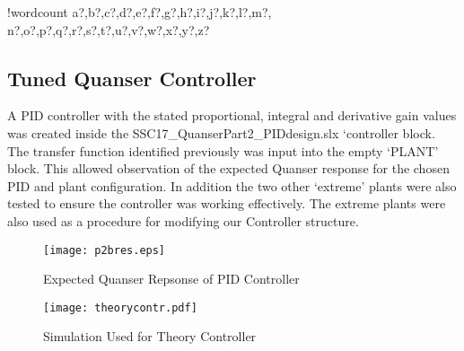 \documentclass[11pt]{article}
\newcounter{words}
\newenvironment{counted}{%
  \setcounter{words}{0}
  \SearchList!{wordcount}{\stepcounter{words}}
    {a?,b?,c?,d?,e?,f?,g?,h?,i?,j?,k?,l?,m?,
    n?,o?,p?,q?,r?,s?,t?,u?,v?,w?,x?,y?,z?}
  \UndoBoundary{'}
  \SearchOrder{p;}}{%
  \StopSearching}
\begin{document}
\begin{counted}
\subsection{Tuned Quanser Controller}\label{tuned-quanser-controller}

A PID controller with the stated proportional, integral and derivative
gain values was created inside the SSC17\_QuanserPart2\_PIDdesign.slx
`controller block. The transfer function identified previously was input
into the empty `PLANT' block. This allowed observation of the expected
Quanser response for the chosen PID and plant configuration. In addition
the two other `extreme' plants were also tested to ensure the controller
was working effectively. The extreme plants were also used as a
procedure for modifying our Controller structure.

\begin{figure}[H]
\centering
\begin{minipage}{.495\textwidth}
 \centering
 \texttt{[image: p2bres.eps]}
 \vspace{-20pt}
 \caption{Expected Quanser Repsonse of PID Controller}
 \label{p2bres}
\end{minipage}
\hfill
\begin{minipage}{.495\textwidth}
\centering
\texttt{[image: theorycontr.pdf]}
\vspace{-10pt}
\caption{Simulation Used for Theory Controller}
\label{paramtab}
\end{minipage}
\vspace{-20pt}
\end{figure}

\end{counted} %


% 

\printbibliography
\end{document}
